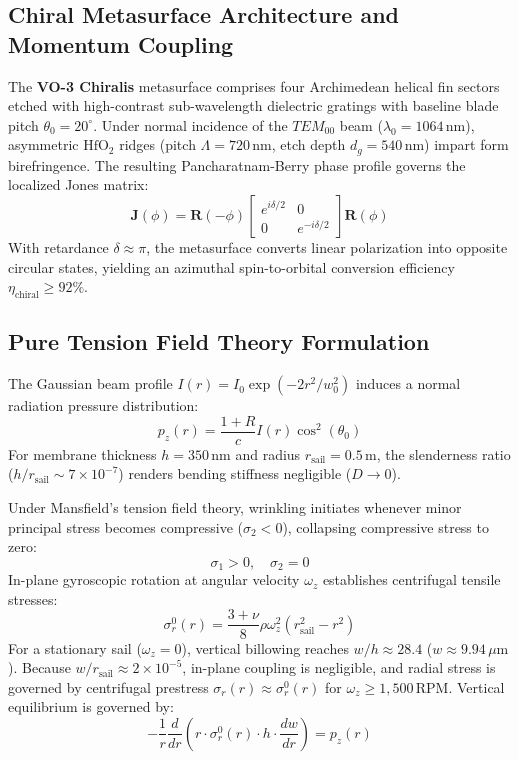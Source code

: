 \documentclass[11pt, a4paper]{article}
\begin{document}
\subsection{Chiral Metasurface Architecture and Momentum Coupling}
The \textbf{VO-3 Chiralis} metasurface comprises four Archimedean helical fin sectors etched with high-contrast sub-wavelength dielectric gratings with baseline blade pitch $\theta_0 = 20^\circ$. Under normal incidence of the $TEM_{00}$ beam ($\lambda_0 = 1064\,\text{nm}$), asymmetric $\text{HfO}_2$ ridges (pitch $\Lambda = 720\,\text{nm}$, etch depth $d_g = 540\,\text{nm}$) impart form birefringence. The resulting Pancharatnam-Berry phase profile governs the localized Jones matrix:
\begin{equation}
    \mathbf{J}(\phi) = \mathbf{R}(-\phi) \begin{bmatrix} e^{i\delta/2} & 0 \\ 0 & e^{-i\delta/2} \end{bmatrix} \mathbf{R}(\phi)
\end{equation}
With retardance $\delta \approx \pi$, the metasurface converts linear polarization into opposite circular states, yielding an azimuthal spin-to-orbital conversion efficiency $\eta_{\text{chiral}} \ge 92\%$.

\subsection{Pure Tension Field Theory Formulation}
The Gaussian beam profile $I(r) = I_0 \exp(-2r^2/w_0^2)$ induces a normal radiation pressure distribution:
\begin{equation}
    p_z(r) = \frac{1 + R}{c} I(r) \cos^2(\theta_0)
\end{equation}
For membrane thickness $h = 350\,\text{nm}$ and radius $r_{\text{sail}} = 0.5\,\text{m}$, the slenderness ratio ($h / r_{\text{sail}} \sim 7 \times 10^{-7}$) renders bending stiffness negligible ($D \to 0$).

Under Mansfield's tension field theory, wrinkling initiates whenever minor principal stress becomes compressive ($\sigma_2 < 0$), collapsing compressive stress to zero:
\begin{equation}
    \sigma_1 > 0, \quad \sigma_2 = 0
\end{equation}
In-plane gyroscopic rotation at angular velocity $\omega_z$ establishes centrifugal tensile stresses:
\begin{equation}
    \sigma_r^0(r) = \frac{3+\nu}{8} \rho \omega_z^2 \left( r_{\text{sail}}^2 - r^2 \right)
\end{equation}
For a stationary sail ($\omega_z = 0$), vertical billowing reaches $w/h \approx 28.4$ ($w \approx 9.94\,\mu\text{m}$). Because $w / r_{\text{sail}} \approx 2 \times 10^{-5}$, in-plane coupling is negligible, and radial stress is governed by centrifugal prestress $\sigma_r(r) \approx \sigma_r^0(r)$ for $\omega_z \ge 1,500\,\text{RPM}$. Vertical equilibrium is governed by:
\begin{equation}
    - \frac{1}{r} \frac{d}{dr} \left( r \cdot \sigma_r^0(r) \cdot h \cdot \frac{dw}{dr} \right) = p_z(r)
\end{equation}
\end{document}
